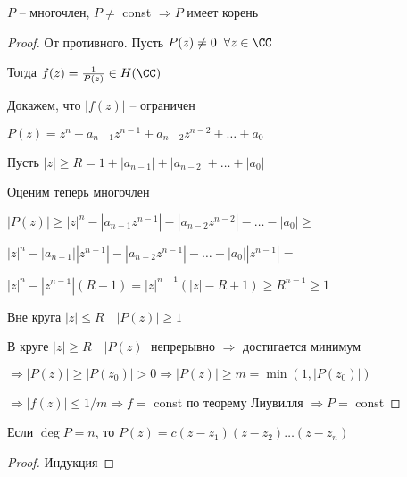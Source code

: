 \begin{theorem}\thmslashn
	
	$P$ -- многочлен, $P \not=$ const $\Rightarrow P$ имеет корень
	
\end{theorem}


\begin{proof}\thmslashn
	
	От противного. Пусть $P(z) \not = 0 \;\; \forall z \in \CC$
	
	Тогда $f(z) = \frac{1}{P(z)} \in H(\CC)$
	
	Докажем, что $|f(z)|$ -- ограничен
	
	$P(z) = z^n + a_{n-1}z^{n-1} + a_{n-2}z^{n-2} + \ldots + a_0$
	
	Пусть $|z| \geqslant R = 1 + |a_{n-1}| + |a_{n-2}| + \ldots + |a_0|$	
	
	Оценим теперь многочлен
	
	$|P(z)| \geqslant |z|^n - |a_{n-1}z^{n-1}| - |a_{n-2}z^{n-2}| - \ldots - |a_0| \geqslant$
	
	
	$|z|^n - |a_{n-1}||z^{n-1}| - |a_{n-2}z^{n-1}| - \ldots - |a_0||z^{n-1}| = $
	
	
	$|z|^n - |z^{n-1}|(R-1) = |z|^{n-1} (|z| - R + 1) \geqslant R^{n-1} \geqslant 1 $
	
	Вне круга $|z| \leqslant R \quad |P(z)| \geqslant 1$
	
	В круге $|z| \geqslant R \quad |P(z)|$ непрерывно $\Rightarrow$ достигается минимум 
	
	$\Rightarrow |P(z)| \geqslant |P(z_0)| > 0 \Rightarrow |P(z)| \geqslant m = \min(1, |P(z_0)|)$
	
	$\Rightarrow |f(z)| \leqslant 1/m \Rightarrow f = $ const по теорему Лиувилля $\Rightarrow P =$ const
	
\end{proof}

\begin{consequence}\thmslashn
	
	Если $\deg P = n$, то $P(z) = c(z - z_1)(z-z_2)\ldots(z-z_n)$
	
\end{consequence}

\begin{proof}
	Индукция
\end{proof}
